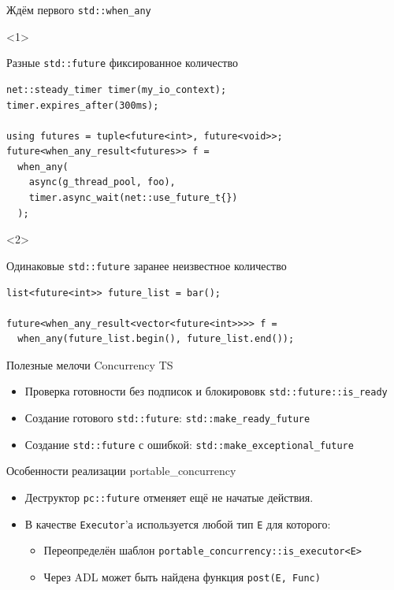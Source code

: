 \documentclass[aspectratio=169,pdf,hyperref={unicode},14pt]{beamer}
\begin{document}
\begin{frame}[fragile,t]{Ждём первого \texttt{std::when\_any}}
  \begin{itemize}
    \begin{onlyenv}<1>
    \item Разные \texttt{std::future} фиксированное количество
    \begin{lstlisting}[style=cppcode]
net::steady_timer timer(my_io_context);
timer.expires_after(300ms);

using futures = tuple<future<int>, future<void>>;
future<when_any_result<futures>> f =
  when_any(
    async(g_thread_pool, foo),
    timer.async_wait(net::use_future_t{})
  );
    \end{lstlisting}
    \end{onlyenv}

    \begin{onlyenv}<2>
    \item Одинаковые \texttt{std::future} заранее неизвестное количество
    \begin{lstlisting}[style=cppcode]
list<future<int>> future_list = bar();

future<when_any_result<vector<future<int>>>> f =
  when_any(future_list.begin(), future_list.end());
    \end{lstlisting}
    \end{onlyenv}
  \end{itemize}
\end{frame}

\begin{frame}[fragile,t]{Полезные мелочи Concurrency TS}
  \begin{itemize}[<+->]
   \item Проверка готовности без подписок и блокирововк \texttt{std::future::is\_ready}
   \item Создание готового \texttt{std::future}: \texttt{std::make\_ready\_future}
   \item Создание \texttt{std::future} с ошибкой: \texttt{std::make\_exceptional\_future}
  \end{itemize}
\end{frame}

\begin{frame}[fragile,t]{Особенности реализации portable\_concurrency}
  \begin{itemize}[<+->]
   \item Деструктор \texttt{pc::future} отменяет ещё не начатые действия.
   \item В качестве \texttt{Executor}'а используется любой тип \texttt{E} для которого:
   \begin{itemize}
    \item Переопределён шаблон \texttt{portable\_concurrency::is\_executor<E>}
    \item Через ADL может быть найдена функция \texttt{post(E,~Func)}
   \end{itemize}

  \end{itemize}
\end{frame}
\end{document}

